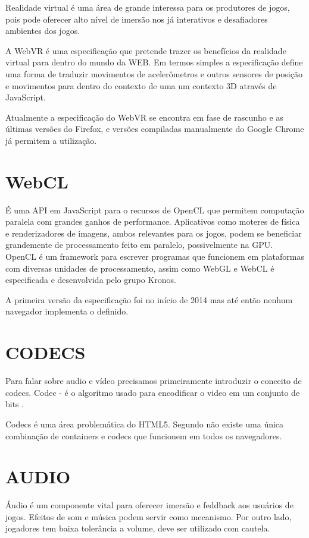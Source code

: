 Realidade virtual é uma área de grande interessa para os produtores
de jogos, pois pode oferecer alto nível de imersão nos já
interativos e desafiadores ambientes dos jogos.

A WebVR é uma especificação que pretende trazer os benefícios
da realidade virtual para dentro do mundo da WEB. Em termos simples
a especificação define uma forma de traduzir movimentos de
acelerômetros e outros sensores de posição e movimentos para dentro
do contexto de uma um contexto 3D através de JavaScript.

Atualmente a especificação do WebVR se encontra em fase de rascunho e
as últimas versões do Firefox, e versões compiladas manualmente do
Google Chrome já permitem a utilização.


\section{WebCL}
É uma API em JavaScript para o recursos de OpenCL que permitem
computação paralela com grandes ganhos de performance. Aplicativos
como moteres de física e renderizadores de imagens, ambos relevantes
para os jogos, podem se beneficiar grandemente de processamento feito em
paralelo, possivelmente na GPU. OpenCL é um framework para escrever
programas que funcionem em plataformas com diversas unidades de
processamento, assim como WebGL e WebCL é especificada e desenvolvida
pelo grupo Kronos.

A primeira versão da especificação foi no início de 2014 mas até
então nenhum navegador implementa o definido.
\section{CODECS}
Para falar sobre audio e vídeo precisamos primeiramente introduzir o
conceito de codecs. Codec - é o algorítmo usado para encodificar o
video em um conjunto de bits \cite{diveIntohtml}.

Codecs é uma área problemática do HTML5. Segundo \cite{diveIntohtml}
não existe uma única combinação de containers e codecs que funcionem
em todos os navegadores.

\section{AUDIO}
Áudio é um componente vital para oferecer imersão e feddback
aos usuários de jogos. Efeitos de som e música podem servir como
mecanismo. Por outro lado, jogadores tem baixa tolerância a volume,
deve ser utilizado com cautela.

